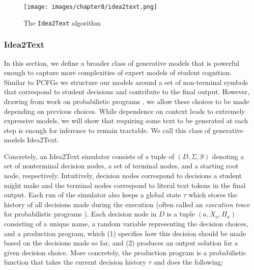 \begin{figure}
    \centering
    \texttt{[image: images/chapter8/idea2text.png]}
    \caption{The \texttt{Idea2Text} algorithm}
    \label{fig:idea2text:algo}
\end{figure}

\subsubsection{Idea2Text}

In this section, we define a broader class of generative models that is powerful enough to capture more complexities of expert models of student cognition.
Similar to PCFGs we structure our models around a set of non-terminal symbols that correspond to student decisions and contribute to the final output. However, drawing from work on probabilistic programs \cite{goodman2012church, goodman2014design}, we allow these choices to be made depending on previous choices.
While dependence on context leads to extremely expressive models, we will show that requiring some text to be generated at each step is enough for inference to remain tractable.
We call this class of generative models Idea2Text.

Concretely, an Idea2Text simulator consists of a tuple of $(D, \Sigma, S)$ denoting a set of nonterminal decision nodes, a set of terminal nodes, and a starting root node, respectively. Intuitively, decision nodes correspond to decisions a student might make and the terminal nodes correspond to literal text tokens in the final output. Each run of the simulator also keeps a global state $\tau$ which stores the history of all decisions made during the execution (often called an \emph{execution trace} for probabilistic programs \cite{pyro, wingategoodman}).
Each decision node in $D$ is a tuple $(a, X_a, \Pi_a)$ consisting of a unique name, a random variable representing the decision choices, and a production program, which (1) specifies how this decision should be made based on the decisions made so far, and (2) produces an output solution for a given decision choice.
More concretely, the production program is a probabilistic function that takes the current decision history $\tau$ and does the following:


